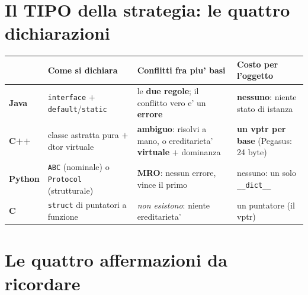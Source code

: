 \documentclass{report}
\newcommand{\code}[1]{\texttt{\small #1}}
\begin{document}
\section{Il TIPO della strategia: le quattro dichiarazioni}

\begin{center}
\renewcommand{\arraystretch}{1.35}
\setlength{\tabcolsep}{4pt}
\footnotesize
\begin{tabular}{|>{\raggedright\arraybackslash}p{1.7cm}|>{\raggedright\arraybackslash}p{3.4cm}|>{\raggedright\arraybackslash}p{3.4cm}|>{\raggedright\arraybackslash}p{3.6cm}|}
\hline
 & \textbf{Come si dichiara} & \textbf{Conflitti fra piu' basi} & \textbf{Costo per l'oggetto} \\
\hline
\textbf{Java} & \code{interface} $+$ \code{default}/\code{static} & le \textbf{due regole}; il conflitto vero e' un \textbf{errore} & \textbf{nessuno}: niente stato di istanza \\
\hline
\textbf{C++} & classe astratta pura $+$ dtor virtuale & \textbf{ambiguo}: risolvi a mano, o ereditarieta' \textbf{virtuale} $+$ dominanza & \textbf{un vptr per base} (Pegasus: 24 byte) \\
\hline
\textbf{Python} & \code{ABC} (nominale) o \code{Protocol} (strutturale) & \textbf{MRO}: nessun errore, vince il primo & nessuno: un solo \code{\_\_dict\_\_} \\
\hline
\textbf{C} & \code{struct} di puntatori a funzione & \emph{non esistono}: niente ereditarieta' & un puntatore (il vptr) \\
\hline
\end{tabular}
\end{center}


\section{Le quattro affermazioni da ricordare}
\end{document}
